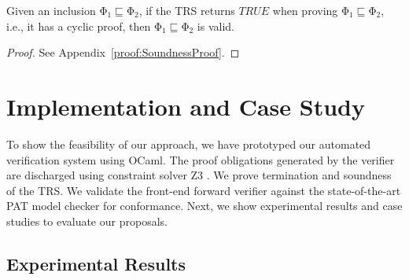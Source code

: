 \documentclass[acmsmall,10pt,review]{acmart}
\newcommand{\effect}{{\ensuremath{\mathrm{\Phi}}}}
\newcommand{\code}[1]{{\tt{\ensuremath{\m{#1}}}}}
\newcommand{\CONTAIN}{\sqsubseteq}
\newcommand{\m}{\mathit}
\newcommand\appref[1]{Appendix~\textcolor{blue}{\ref{#1}}}
\begin{document}
{ \begin{theorem}\label{Cyclicsoundness}
Given an inclusion \code{\effect_1 \CONTAIN \effect_2}, if the TRS returns \code{TRUE} when proving \code{\effect_1 \CONTAIN \effect_2}, i.e., it has a cyclic proof, 
then \code{\effect_1 \CONTAIN \effect_2} is valid.
\end{theorem}


\begin{proof}
See %
\appref{proof:SoundnessProof}.
\end{proof}





\section{Implementation and Case Study}
\label{sec:Evaluation}


To show the feasibility of our approach, we have prototyped 
our automated verification system 
using OCaml. The proof obligations generated by the verifier 
are discharged using constraint solver Z3 
\citep{DBLP:conf/tacas/MouraB08}. 
We prove termination and soundness of the TRS. We validate 
the front-end forward verifier against the state-of-the-art PAT 
\cite{DBLP:conf/cav/SunLDP09} model checker for conformance. 
Next, we show experimental results and case studies to evaluate our proposals. 

\subsection{Experimental Results}
\label{subsec:Experimental_Results}








}
\end{document}
